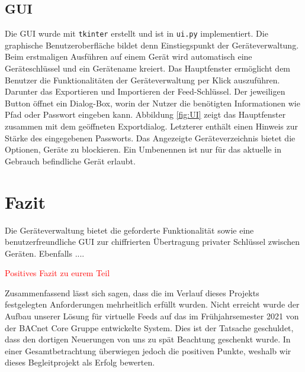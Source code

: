 \documentclass[a4paper,titlepage]{article}
\newcommand{\ilc}[1]{\textcolor{codeColor}{\texttt{#1}}}
\newcommand{\titleName}{Multi Device Feed}
\begin{document}
\subsection{GUI}
Die GUI wurde mit \ilc{tkinter} erstellt und ist in \ilc{ui.py} implementiert. Die graphische Benutzeroberfläche bildet denn Einstiegspunkt der Geräteverwaltung. Beim erstmaligen Ausführen auf einem Gerät wird automatisch eine Geräteschlüssel und ein Gerätename kreiert. Das Hauptfenster ermöglicht dem Benutzer die Funktionalitäten der Geräteverwaltung per Klick auszuführen. Darunter das Exportieren und Importieren der Feed-Schlüssel. Der jeweiligen Button öffnet ein Dialog-Box, worin der Nutzer die benötigten Informationen wie Pfad oder Passwort eingeben kann. Abbildung \ref{fig:UI} zeigt das Hauptfenster zusammen mit dem geöffneten Exportdialog. Letzterer enthält einen Hinweis zur Stärke des eingegebenen Passworts. Das Angezeigte Geräteverzeichnis bietet die Optionen, Geräte zu blockieren. Ein Umbenennen ist nur für das aktuelle in Gebrauch befindliche Gerät erlaubt.

\section{Fazit}
Die Geräteverwaltung bietet die geforderte Funktionalität sowie eine benutzerfreundliche GUI zur chiffrierten Übertragung privater Schlüssel zwischen Geräten. Ebenfalls ....

\textcolor{red}{Positives Fazit zu eurem Teil}

Zusammenfassend lässt sich sagen, dass die im Verlauf dieses Projekts festgelegten Anforderungen mehrheitlich erfüllt wurden. Nicht erreicht wurde der Aufbau unserer Lösung für virtuelle Feeds auf das im Frühjahrsemester 2021 von der BACnet Core Gruppe entwickelte System. Dies ist der Tatsache geschuldet, dass den dortigen Neuerungen von uns zu spät Beachtung geschenkt wurde. In einer Gesamtbetrachtung überwiegen jedoch die positiven Punkte, weshalb wir dieses Begleitprojekt als Erfolg bewerten.


\clearpage
\pagestyle{empty}
\fancyhf{}
\lhead{\titleName}
\pagestyle{fancy}
\lhead{\titleName}
\label{appendixPage} %


\end{document}
